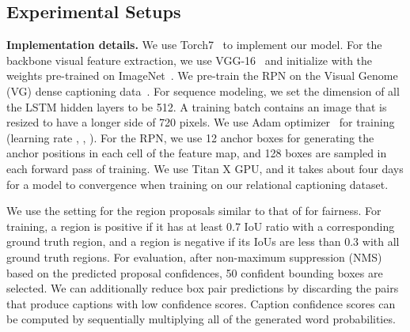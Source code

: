 \subsection{Experimental Setups}
\label{sec:exp_setup}
\noindent\textbf{Implementation details.}
We use Torch7~\cite{collobert2011torch7} to implement our model.
For the {backbone} visual feature extraction, we use VGG-16~\cite{simonyan2014very} and initialize with the weights pre-trained on ImageNet~\cite{russakovsky2015imagenet}.
We pre-train the RPN on the Visual Genome (VG) dense captioning data~\cite{krishna2017visual}. 
For sequence modeling, we set the {dimension} of 
all the LSTM hidden layers
to be 512.
A training batch contains an image that is resized to have a longer side of 720 pixels. 
We use Adam optimizer~\cite{ba2015adam} for training (learning rate , , ).
For the RPN, we use 12 anchor boxes for generating the anchor positions in each cell of the feature map, and 128 boxes are sampled in each forward pass of training.
We use Titan X GPU, and it takes about four days for a model to convergence when training on our relational captioning dataset.



We use the setting for the region proposals similar to that of \cite{johnson2016densecap} for fairness.
For training, a region is positive if it has 
{at least 0.7 IoU ratio with a corresponding ground truth region,}
and 
{a region is negative if its IoUs are less than 0.3 with all ground truth regions.}
For evaluation, after non-maximum suppression (NMS) based on the predicted proposal confidences, 50 confident bounding boxes are selected.  
{We can additionally reduce box pair predictions by discarding the pairs that produce captions with low 
confidence scores.
Caption confidence scores can be computed by sequentially multiplying all of the generated word probabilities.}






